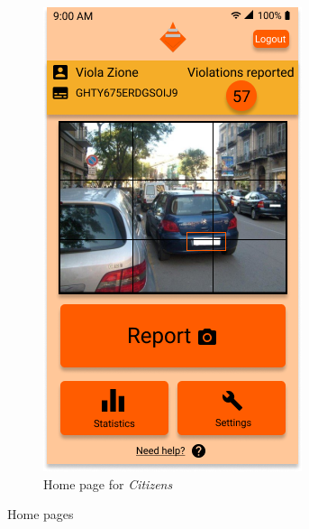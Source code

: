 \documentclass{article}
\begin{document}
\begin{figure}[H]
\begin{subfigure}{0.5\textwidth}
        \includegraphics[width=0.9\linewidth]{img/mockups/home_citizen.png}
        \caption{Home page for \textit{Citizens}}
        \label{fig:subim2}
    \end{subfigure}
    \caption{Home pages}
    \label{fig:image2}
\end{figure}

\clearpage
\end{document}
